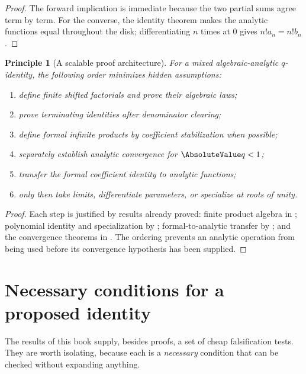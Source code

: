 \documentclass[11pt,a4paper,oneside,openany]{book}
\newtheorem{principle}[principle]{Principle}
\theoremstyle{definition}
\theoremstyle{remark}
\begin{document}
\begin{proof}
The forward implication is immediate because the two partial sums agree term by term.  For the converse, the identity theorem makes the analytic functions equal throughout the disk; differentiating $n$ times at $0$ gives $n!a_n=n!b_n$.
\end{proof}

\begin{principle}[A scalable proof architecture]\label{prin:proof-architecture}
For a mixed algebraic-analytic $q$-identity, the following order minimizes hidden assumptions:
\begin{enumerate}
\item define finite shifted factorials and prove their algebraic laws;
\item prove terminating identities after denominator clearing;
\item define formal infinite products by coefficient stabilization when possible;
\item separately establish analytic convergence for $\AbsoluteValue q<1$;
\item transfer the formal coefficient identity to analytic functions;
\item only then take limits, differentiate parameters, or specialize at roots of unity.
\end{enumerate}
\end{principle}

\begin{proof}
Each step is justified by results already proved: finite product algebra in ; polynomial identity and specialization by ; formal-to-analytic transfer by ; and the convergence theorems in .  The ordering prevents an analytic operation from being used before its convergence hypothesis has been supplied.
\end{proof}

\section{Necessary conditions for a proposed identity}

The results of this book supply, besides proofs, a set of cheap falsification
tests.  They are worth isolating, because each is a \emph{necessary}
condition that can be checked without expanding anything.
\end{document}
